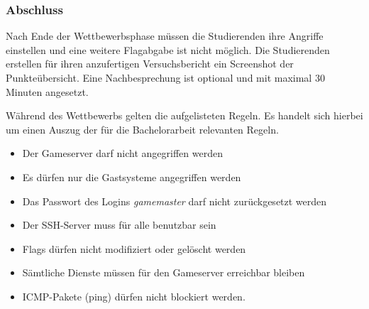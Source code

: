\subsubsection{Abschluss}
Nach Ende der Wettbewerbsphase müssen die Studierenden ihre Angriffe einstellen und eine weitere Flagabgabe ist nicht möglich. Die Studierenden erstellen für ihren anzufertigen Versuchsbericht ein Screenshot der Punkteübersicht. Eine Nachbesprechung ist optional und mit maximal 30 Minuten angesetzt.

Während des Wettbewerbs gelten die aufgelisteten Regeln. Es handelt sich hierbei um einen Auszug der für die Bachelorarbeit relevanten Regeln.
\begin{itemize}
\item Der Gameserver darf nicht angegriffen werden
\item Es dürfen nur die Gastsysteme angegriffen werden
\item Das Passwort des Logins \textit{gamemaster} darf nicht zurückgesetzt werden
\item Der SSH-Server muss für alle benutzbar sein
\item Flags dürfen nicht modifiziert oder gelöscht werden
\item Sämtliche Dienste müssen für den Gameserver erreichbar bleiben
\item ICMP-Pakete (ping) dürfen nicht blockiert werden.
\end{itemize} \cite[S.9]{quadePraktikumITSecurity2017}\cite[S.10-11]{sosnaKonzeptionUndRealisierung2010}
